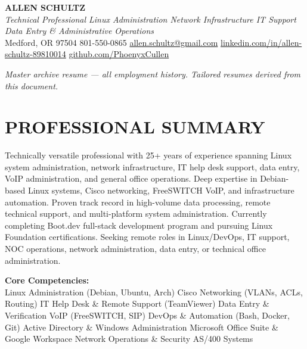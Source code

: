 \documentclass[9pt,letterpaper]{extarticle}
\begin{document}
\begin{center}
  {\fontsize{14}{16.8}\bfseries\color{accent}\selectfont ALLEN SCHULTZ}\\[3pt]
  {\normalsize\itshape Technical Professional \textbar{} Linux Administration \textbar{} Network Infrastructure \textbar{} IT Support \textbar{} Data Entry \& Administrative Operations}\\[4pt]
  {\small
    Medford, OR 97504 \textbar{} 801-550-0865 \textbar{}
    \href{mailto:allen.schultz@gmail.com}{allen.schultz@gmail.com} \textbar{}
    \href{https://linkedin.com/in/allen-schultz-89810014}{linkedin.com/in/allen-schultz-89810014} \textbar{}
    \href{https://github.com/PhoenyxCullen}{github.com/PhoenyxCullen}
  }
\end{center}
\vspace{2pt}
\noindent\textit{\small Master archive resume --- all employment history. Tailored resumes derived from this document.}

\section*{PROFESSIONAL SUMMARY}

Technically versatile professional with 25+ years of experience spanning Linux system administration, network infrastructure, IT help desk support, data entry, VoIP administration, and general office operations. Deep expertise in Debian-based Linux systems, Cisco networking, FreeSWITCH VoIP, and infrastructure automation. Proven track record in high-volume data processing, remote technical support, and multi-platform system administration. Currently completing Boot.dev full-stack development program and pursuing Linux Foundation certifications. Seeking remote roles in Linux/DevOps, IT support, NOC operations, network administration, data entry, or technical office administration.

\smallskip
\textbf{Core Competencies:}\\
Linux Administration (Debian, Ubuntu, Arch) \textbullet{}
Cisco Networking (VLANs, ACLs, Routing) \textbullet{}
IT Help Desk \& Remote Support (TeamViewer) \textbullet{}
Data Entry \& Verification \textbullet{}
VoIP (FreeSWITCH, SIP) \textbullet{}
DevOps \& Automation (Bash, Docker, Git) \textbullet{}
Active Directory \& Windows Administration \textbullet{}
Microsoft Office Suite \& Google Workspace \textbullet{}
Network Operations \& Security \textbullet{}
AS/400 Systems
\end{document}
